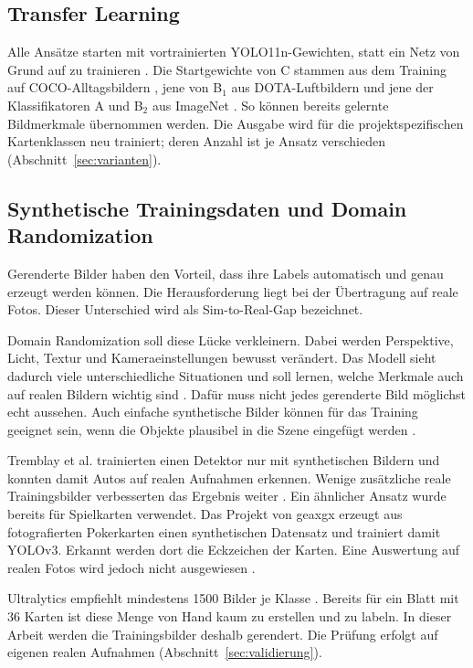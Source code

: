 \subsection{Transfer Learning}\label{sec:transfer}

Alle Ansätze starten mit vortrainierten YOLO11n-Gewichten, statt ein Netz
von Grund auf zu trainieren \cite{pan2010transfer}. Die Startgewichte
von C stammen aus dem Training auf COCO-Alltagsbildern \cite{lin2014coco}, jene von B$_1$
aus DOTA-Luftbildern \cite{xia2018dota} und jene der Klassifikatoren A und B$_2$ aus
ImageNet \cite{russakovsky2015imagenet,ultralytics2025yolo11docs}. So können bereits gelernte
Bildmerkmale übernommen werden. Die Ausgabe wird für die
projektspezifischen Kartenklassen neu trainiert; deren Anzahl ist je
Ansatz verschieden (Abschnitt~\ref{sec:varianten}).

\subsection{Synthetische Trainingsdaten und Domain Randomization}\label{sec:synthdata}

Gerenderte Bilder haben den Vorteil, dass ihre Labels automatisch und
genau erzeugt werden können. Die Herausforderung liegt bei der
Übertragung auf reale Fotos. Dieser Unterschied wird als
Sim-to-Real-Gap bezeichnet.

Domain Randomization soll diese Lücke verkleinern. Dabei werden
Perspektive, Licht, Textur und Kameraeinstellungen bewusst verändert.
Das Modell sieht dadurch viele unterschiedliche Situationen und soll
lernen, welche Merkmale auch auf realen Bildern wichtig sind
\cite{tobin2017domain}. Dafür muss nicht jedes gerenderte Bild möglichst
echt aussehen. Auch einfache synthetische Bilder können für das Training
geeignet sein, wenn die Objekte plausibel in die Szene eingefügt werden
\cite{dwibedi2017cut}.

Tremblay et al. trainierten einen Detektor nur mit synthetischen Bildern
und konnten damit Autos auf realen Aufnahmen erkennen. Wenige zusätzliche
reale Trainingsbilder verbesserten das Ergebnis weiter
\cite{tremblay2018training}. Ein ähnlicher Ansatz wurde bereits für
Spielkarten verwendet. Das Projekt von geaxgx erzeugt aus fotografierten
Pokerkarten einen synthetischen Datensatz und trainiert damit YOLOv3.
Erkannt werden dort die Eckzeichen der Karten. Eine Auswertung auf realen
Fotos wird jedoch nicht ausgewiesen \cite{geaxgx2018cards}.

Ultralytics empfiehlt mindestens 1500 Bilder je Klasse
\cite{ultralytics2025tips}. Bereits für ein Blatt mit 36 Karten ist diese
Menge von Hand kaum zu erstellen und zu labeln. In dieser Arbeit werden
die Trainingsbilder deshalb gerendert. Die Prüfung erfolgt auf eigenen
realen Aufnahmen (Abschnitt~\ref{sec:validierung}).

